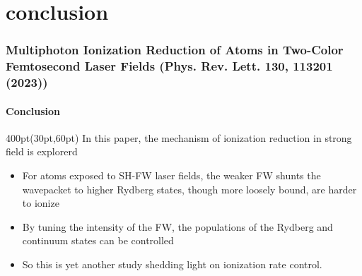 
\section{conclusion}

\begin{frame}
\frametitle{Multiphoton Ionization Reduction of Atoms in Two-Color
Femtosecond Laser Fields \small (Phys. Rev. Lett. \textbf{130}, 113201 (2023))}
\framesubtitle{Conclusion}


\small
\begin{textblock*}{400pt}(30pt,60pt)
\vspace{30pt}
In this paper, the mechanism of ionization reduction 
in strong field is explorerd
\begin{itemize}
\footnotesize
\item For atoms exposed to SH-FW laser fields, 
the weaker FW shunts the wavepacket to higher Rydberg states, 
though more loosely bound, are harder to ionize
\item By tuning the intensity of the FW, the populations 
of the Rydberg and continuum states can be controlled

\vspace{20pt}

\item So this is yet another study shedding light on ionization rate control.
\end{itemize}

\end{textblock*}



\end{frame}

